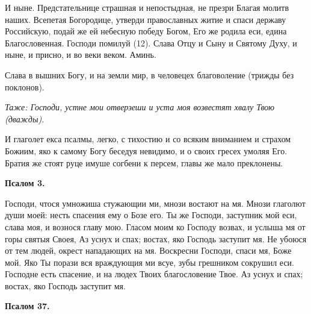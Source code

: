 И ныне. Предстательнице страшная и непостыдная, не презри Благая молитв наших. Всепетая Богородице, утверди православных житие и спаси державу Российскую, подай же ей небесную победу Богом, Его же родила еси, едина Благословенная. Господи помилуй (12). Слава Отцу и Сыну и Святому Духу, и ныне, и присно, и во веки веком. Аминь.

Слава в вышних Богу, и на земли мир, в человецех благоволение (трижды без поклонов).


\itshape Таже:\normalfont{} Господи, устне мои отверзеши и уста моя возвестят хвалу Твою (дважды). 

И глаголет екса псалмы, легко, с тихостию и со всяким вниманием и страхом Божиим, яко к самому Богу беседуя невидимо, и о своих гресех умоляя Его. Братия же стоят руце имуше согбени к персем, главы же мало преклонены.


\medskip


\bfseries Псалом 3.\normalfont{}\nopagebreak


Господи, чтося умножиша стужающии ми, мнози востают на мя. Мнози глаголют души моей: несть спасения ему о Бозе его. Ты же Господи, заступник мой еси, слава моя, и вознося главу мою. Гласом моим ко Господу возвах, и услыша мя от горы святыя Своея, Аз уснух и спах; востах, яко Господь заступит мя. Не убоюся от тем людей, окрест нападающих на мя. Воскресни Господи, спаси мя, Боже мой. Яко Ты порази вся враждующия ми всуе, зубы грешником сокрушил еси. Господне есть спасение, и на людех Твоих благословение Твое. Аз уснух и спах; востах, яко Господь заступит мя.


\medskip


\bfseries Псалом 37.\normalfont{}\nopagebreak


